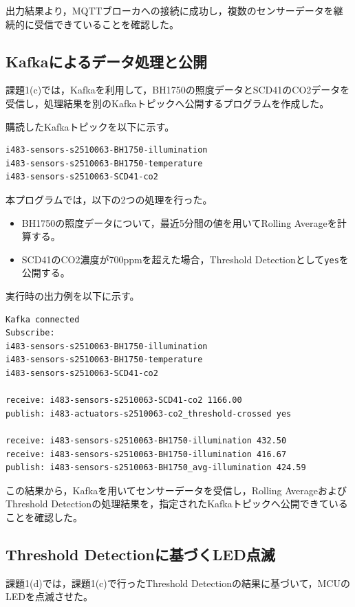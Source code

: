 \documentclass[a4paper,11pt,lualatex,ja=standard]{bxjsarticle}
\begin{document}
出力結果より，MQTTブローカへの接続に成功し，複数のセンサーデータを継続的に受信できていることを確認した。

\subsection{Kafkaによるデータ処理と公開}

課題1(c)では，Kafkaを利用して，BH1750の照度データとSCD41のCO2データを受信し，処理結果を別のKafkaトピックへ公開するプログラムを作成した。

購読したKafkaトピックを以下に示す。

\begin{verbatim}
i483-sensors-s2510063-BH1750-illumination
i483-sensors-s2510063-BH1750-temperature
i483-sensors-s2510063-SCD41-co2
\end{verbatim}

本プログラムでは，以下の2つの処理を行った。

\begin{itemize}
\item BH1750の照度データについて，最近5分間の値を用いてRolling Averageを計算する。
\item SCD41のCO2濃度が700ppmを超えた場合，Threshold Detectionとして\texttt{yes}を公開する。
\end{itemize}

実行時の出力例を以下に示す。

\begin{verbatim}
Kafka connected
Subscribe:
i483-sensors-s2510063-BH1750-illumination
i483-sensors-s2510063-BH1750-temperature
i483-sensors-s2510063-SCD41-co2

receive: i483-sensors-s2510063-SCD41-co2 1166.00
publish: i483-actuators-s2510063-co2_threshold-crossed yes

receive: i483-sensors-s2510063-BH1750-illumination 432.50
receive: i483-sensors-s2510063-BH1750-illumination 416.67
publish: i483-sensors-s2510063-BH1750_avg-illumination 424.59
\end{verbatim}

この結果から，Kafkaを用いてセンサーデータを受信し，Rolling AverageおよびThreshold Detectionの処理結果を，指定されたKafkaトピックへ公開できていることを確認した。

\subsection{Threshold Detectionに基づくLED点滅}

課題1(d)では，課題1(c)で行ったThreshold Detectionの結果に基づいて，MCUのLEDを点滅させた。
\end{document}
